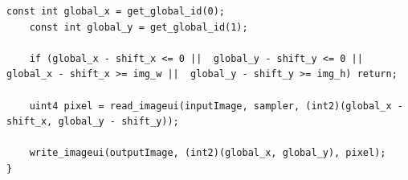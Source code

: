 \documentclass[12pt]{article}
\begin{document}
\begin{lstlisting}[style=CStyle, caption={prog.c}, label={annex:prog}]
    const int global_x = get_global_id(0);
    const int global_y = get_global_id(1);

    if (global_x - shift_x <= 0 ||  global_y - shift_y <= 0 || global_x - shift_x >= img_w ||  global_y - shift_y >= img_h) return;

    uint4 pixel = read_imageui(inputImage, sampler, (int2)(global_x - shift_x, global_y - shift_y));    

    write_imageui(outputImage, (int2)(global_x, global_y), pixel);    
}

\end{lstlisting}
\end{document}

